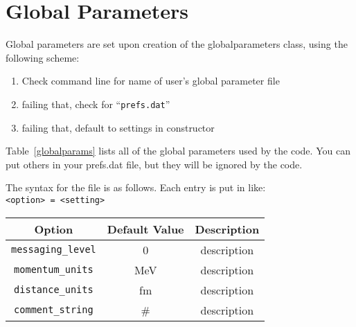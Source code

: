 \section{Global Parameters}
Global parameters are set upon creation of the globalparameters class, using the
following scheme:
\begin{enumerate}
    \item Check command line for name of user's global parameter file
    \item failing that, check for ``{\tt prefs.dat}''
    \item failing that, default to settings in constructor
\end{enumerate}

Table~\ref{globalparams} lists all of the global parameters used by the code.
You can put others in your prefs.dat file, but they will be ignored by the code.

The syntax for the file is as follows.  Each entry is put in like:\\
\verb+<option> = <setting>+

\begin{table*}
\begin{tabular}{|c|c|c|}
    \hline
    Option                 & Default Value & Description\\ \hline
    {\tt messaging\_level} & 0             & description\\ \hline
    {\tt momentum\_units}  & MeV           & description\\ \hline
    {\tt distance\_units}  & fm            & description\\ \hline
    {\tt comment\_string}  & \#            & description\\ \hline
\end{tabular}
\caption{Global settings.}
\label{globalparams}
\end{table*}
